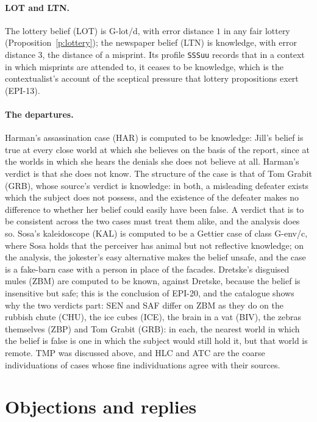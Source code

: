 \documentclass{situationist-preprint}
\begin{document}
\paragraph{LOT and LTN.} The lottery belief (LOT) is G-lot/d, with error distance $1$ in any fair lottery (Proposition~\ref{p:lottery}); the newspaper belief (LTN) is knowledge, with error distance $3$, the distance of a misprint. Its profile \texttt{SSSuu} records that in a context in which misprints are attended to, it ceases to be knowledge, which is the contextualist's account of the sceptical pressure that lottery propositions exert (EPI-13).

\paragraph{The departures.} Harman's assassination case (HAR) is computed to be knowledge: Jill's belief is true at every close world at which she believes on the basis of the report, since at the worlds in which she hears the denials she does not believe at all. Harman's verdict is that she does not know. The structure of the case is that of Tom Grabit (GRB), whose source's verdict is knowledge: in both, a misleading defeater exists which the subject does not possess, and the existence of the defeater makes no difference to whether her belief could easily have been false. A verdict that is to be consistent across the two cases must treat them alike, and the analysis does so. Sosa's kaleidoscope (KAL) is computed to be a Gettier case of class G-env/c, where Sosa holds that the perceiver has animal but not reflective knowledge; on the analysis, the jokester's easy alternative makes the belief unsafe, and the case is a fake-barn case with a person in place of the facades. Dretske's disguised mules (ZBM) are computed to be known, against Dretske, because the belief is insensitive but safe; this is the conclusion of EPI-20, and the catalogue shows why the two verdicts part: SEN and SAF differ on ZBM as they do on the rubbish chute (CHU), the ice cubes (ICE), the brain in a vat (BIV), the zebras themselves (ZBP) and Tom Grabit (GRB): in each, the nearest world in which the belief is false is one in which the subject would still hold it, but that world is remote. TMP was discussed above, and HLC and ATC are the coarse individuations of cases whose fine individuations agree with their sources.

\section{Objections and replies}\label{s:obj}
\end{document}
